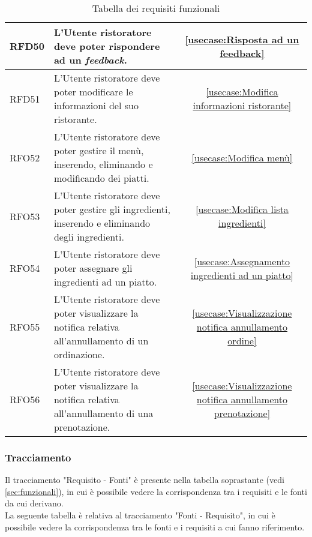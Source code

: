 \begin{table}[H]
\begin{tabularx}{\textwidth}{l|X|c}
		\hline
		RFD50       & L'Utente ristoratore deve poter rispondere ad un \textit{feedback}.                                                     & \autoref{usecase:Risposta ad un feedback}                            \\
		\hline
		RFD51       & L'Utente ristoratore deve poter modificare le informazioni del suo ristorante.                                          & \autoref{usecase:Modifica informazioni ristorante}                   \\
		\hline
		RFO52       & L'Utente ristoratore deve poter gestire il menù, inserendo, eliminando e modificando dei piatti.                        & \autoref{usecase:Modifica menù}                                      \\
		\hline
		RFO53       & L'Utente ristoratore deve poter gestire gli ingredienti, inserendo e eliminando degli ingredienti.                      & \autoref{usecase:Modifica lista ingredienti}                         \\
		\hline
		RFO54       & L'Utente ristoratore deve poter assegnare gli ingredienti ad un piatto.                                                 & \autoref{usecase:Assegnamento ingredienti ad un piatto}              \\
		\hline
		RFO55       & L'Utente ristoratore deve poter visualizzare la notifica relativa all'annullamento di un ordinazione.                   & \autoref{usecase:Visualizzazione notifica annullamento ordine}       \\
		\hline
		RFO56       & L'Utente ristoratore deve poter visualizzare la notifica relativa all'annullamento di una prenotazione.                 & \autoref{usecase:Visualizzazione notifica annullamento prenotazione} \\
	\end{tabularx}
	\caption{Tabella dei requisiti funzionali}
\end{table}

\newpage
\subsubsection{Tracciamento}
Il tracciamento "Requisito - Fonti" è presente nella tabella soprastante (vedi \autoref{sec:funzionali}), in cui è possibile vedere la corrispondenza tra i requisiti e le fonti da cui derivano.\\
La seguente tabella è relativa al tracciamento "Fonti - Requisito", in cui è possibile vedere la corrispondenza tra le fonti e i requisiti a cui fanno riferimento.\\

